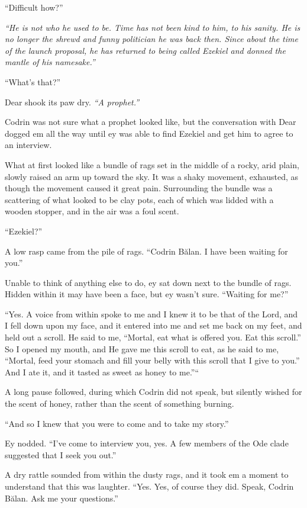 ``Difficult how?''

\emph{``He is not who he used to be. Time has not been kind to him, to his sanity. He is no longer the shrewd and funny politician he was back then. Since about the time of the launch proposal, he has returned to being called Ezekiel and donned the mantle of his namesake.''}

``What's that?''

Dear shook its paw dry. \emph{``A prophet.''}

Codrin was not sure what a prophet looked like, but the conversation with Dear dogged em all the way until ey was able to find Ezekiel and get him to agree to an interview.

What at first looked like a bundle of rags set in the middle of a rocky, arid plain, slowly raised an arm up toward the sky. It was a shaky movement, exhausted, as though the movement caused it great pain. Surrounding the bundle was a scattering of what looked to be clay pots, each of which was lidded with a wooden stopper, and in the air was a foul scent.

``Ezekiel?''

A low rasp came from the pile of rags. ``Codrin Bălan. I have been waiting for you.''

Unable to think of anything else to do, ey sat down next to the bundle of rags. Hidden within it may have been a face, but ey wasn't sure. ``Waiting for me?''

``Yes. A voice from within spoke to me and I knew it to be that of the Lord, and I fell down upon my face, and it entered into me and set me back on my feet, and held out a scroll. He said to me, ``Mortal, eat what is offered you. Eat this scroll.'' So I opened my mouth, and He gave me this scroll to eat, as he said to me, ``Mortal, feed your stomach and fill your belly with this scroll that I give to you.'' And I ate it, and it tasted as sweet as honey to me.''``

A long pause followed, during which Codrin did not speak, but silently wished for the scent of honey, rather than the scent of something burning.

``And so I knew that you were to come and to take my story.''

Ey nodded. ``I've come to interview you, yes. A few members of the Ode clade suggested that I seek you out.''

A dry rattle sounded from within the dusty rags, and it took em a moment to understand that this was laughter. ``Yes. Yes, of course they did. Speak, Codrin Bălan. Ask me your questions.''

